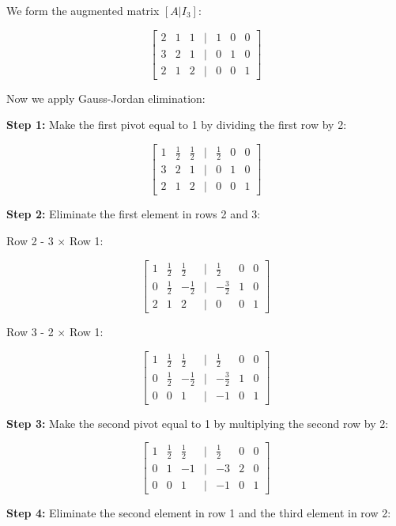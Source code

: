 We form the augmented matrix \([A|I_3]\):

\[
    \begin{bmatrix}
    2 & 1 & 1 & | & 1 & 0 & 0 \\
    3 & 2 & 1 & | & 0 & 1 & 0 \\
    2 & 1 & 2 & | & 0 & 0 & 1
    \end{bmatrix}
\]

Now we apply Gauss-Jordan elimination:

\textbf{Step 1:} Make the first pivot equal to 1 by dividing the first row by 2:

\[
    \begin{bmatrix}
    1 & \frac{1}{2} & \frac{1}{2} & | & \frac{1}{2} & 0 & 0 \\
    3 & 2 & 1 & | & 0 & 1 & 0 \\
    2 & 1 & 2 & | & 0 & 0 & 1
    \end{bmatrix}
\]

\textbf{Step 2:} Eliminate the first element in rows 2 and 3:

Row 2 - 3 \(\times\) Row 1:

\[
    \begin{bmatrix}
    1 & \frac{1}{2} & \frac{1}{2} & | & \frac{1}{2} & 0 & 0 \\
    0 & \frac{1}{2} & -\frac{1}{2} & | & -\frac{3}{2} & 1 & 0 \\
    2 & 1 & 2 & | & 0 & 0 & 1
    \end{bmatrix}
\]

Row 3 - 2 \(\times\) Row 1:

\[
    \begin{bmatrix}
    1 & \frac{1}{2} & \frac{1}{2} & | & \frac{1}{2} & 0 & 0 \\
    0 & \frac{1}{2} & -\frac{1}{2} & | & -\frac{3}{2} & 1 & 0 \\
    0 & 0 & 1 & | & -1 & 0 & 1
    \end{bmatrix}
\]

\textbf{Step 3:} Make the second pivot equal to 1 by multiplying the second row by 2:

\[
    \begin{bmatrix}
    1 & \frac{1}{2} & \frac{1}{2} & | & \frac{1}{2} & 0 & 0 \\
    0 & 1 & -1 & | & -3 & 2 & 0 \\
    0 & 0 & 1 & | & -1 & 0 & 1
    \end{bmatrix}
\]

\textbf{Step 4:} Eliminate the second element in row 1 and the third element in row 2:


